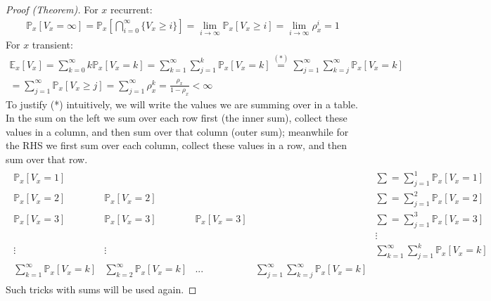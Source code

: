 \begin{proof}[Proof (Theorem)]
	For $x$ recurrent: 
	\begin{gather}
		\mathbb{P}_{x} \left[ V_x = \infty \right] = \mathbb{P}_{x} \left[ \bigcap_{i=0}^{\infty} \{V_x \geq i\} \right] = \lim_{i\to \infty} \mathbb{P}_{x} \left[ V_x \geq i \right] = \lim_{i \to \infty} \rho_x^{i} = 1 
	\end{gather}
	For $x$ transient:
	\begin{gather}
		\mathbb{E}_{x} \left[ V_x \right] = \sum_{k=0}^{\infty} k \mathbb{P}_{x} \left[ V_x = k \right] = \sum_{k=1}^{\infty} \sum_{j=1}^{k} \mathbb{P}_{x} \left[ V_x=k \right] \stackrel{(*)}{=} \sum_{j=1}^{\infty} \sum_{k=j}^{\infty} \mathbb{P}_{x} \left[ V_x=k \right] \\
		= \sum_{j=1}^{\infty} \mathbb{P}_{x} \left[ V_x \geq j \right] = \sum_{j=1}^{\infty} \rho_x^k = \frac{\rho_x}{1-\rho_x} < \infty
	\end{gather}
	To justify (*) intuitively, we will write the values we are summing over in a table. In the sum on the left we sum over each row first (the inner sum), collect these values in a column, and then sum over that column (outer sum); meanwhile for the RHS we first sum over each column, collect these values in a row, and then sum over that row.	
	\begin{gather*}
	\begin{matrix}
	\mathbb{P}_{x} \left[ V_x = 1 \right] & & & & \sum=\sum_{j=1}^{1} \mathbb{P}_{x} \left[ V_x =1 \right]  \\
	\mathbb{P}_{x} \left[ V_x = 2 \right] & \mathbb{P}_{x} \left[ V_x =2 \right] & & & \sum = \sum_{j=1}^{2} \mathbb{P}_{x} \left[ V_x = 2 \right]  \\
	\mathbb{P}_{x} \left[ V_x = 3 \right] & \mathbb{P}_{x} \left[ V_x =3 \right] &  \mathbb{P}_{x} \left[ V_x=3 \right] & & \sum = \sum_{j=1}^{3} \mathbb{P}_{x} \left[ V_x =3 \right]  \\
	& & & & \vdots \\ 
	\vdots & \vdots & & & \sum_{k=1}^{\infty} \sum_{j=1}^{k} \mathbb{P}_{x} \left[ V_x = k \right] \\
	\sum_{k=1}^{\infty} \mathbb{P}_{x} \left[ V_x =k \right] & \sum_{k=2}^{\infty} \mathbb{P}_{x} \left[ V_x=k \right]  &  ...  & \sum_{j=1}^{\infty} \sum_{k=j}^{\infty} \mathbb{P}_{x} \left[ V_x = k \right]  
	\end{matrix}
	\end{gather*}
	Such tricks with sums will be used again.
\end{proof}

